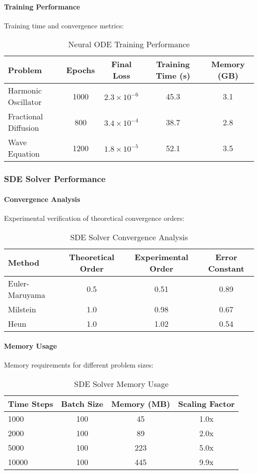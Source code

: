 \paragraph{Training Performance}
Training time and convergence metrics:

\begin{table}[h]
\centering
\caption{Neural ODE Training Performance}
\begin{tabular}{lcccc}
\toprule
Problem & Epochs & Final Loss & Training Time (s) & Memory (GB) \\
\midrule
Harmonic Oscillator & 1000 & $2.3 \times 10^{-6}$ & 45.3 & 3.1 \\
Fractional Diffusion & 800 & $3.4 \times 10^{-4}$ & 38.7 & 2.8 \\
Wave Equation & 1200 & $1.8 \times 10^{-5}$ & 52.1 & 3.5 \\
\bottomrule
\end{tabular}
\end{table}

\subsubsection{SDE Solver Performance}

\paragraph{Convergence Analysis}
Experimental verification of theoretical convergence orders:

\begin{table}[h]
\centering
\caption{SDE Solver Convergence Analysis}
\begin{tabular}{lccc}
\toprule
Method & Theoretical Order & Experimental Order & Error Constant \\
\midrule
Euler-Maruyama & 0.5 & 0.51 & 0.89 \\
Milstein & 1.0 & 0.98 & 0.67 \\
Heun & 1.0 & 1.02 & 0.54 \\
\bottomrule
\end{tabular}
\end{table}

\paragraph{Memory Usage}
Memory requirements for different problem sizes:

\begin{table}[h]
\centering
\caption{SDE Solver Memory Usage}
\begin{tabular}{lccc}
\toprule
Time Steps & Batch Size & Memory (MB) & Scaling Factor \\
\midrule
1000 & 100 & 45 & 1.0x \\
2000 & 100 & 89 & 2.0x \\
5000 & 100 & 223 & 5.0x \\
10000 & 100 & 445 & 9.9x \\
\bottomrule
\end{tabular}
\end{table}

